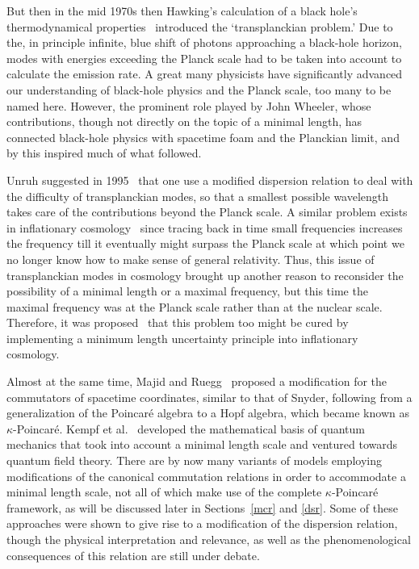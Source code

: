 \documentclass{article}
\begin{document}
But then in the mid 1970s then Hawking's  calculation of a black hole's  
thermodynamical properties~\cite{Hawking} introduced the `transplanckian problem.' Due to the, in principle infinite, blue shift of
photons approaching a black-hole horizon, modes with energies exceeding the Planck scale had to be taken into account
to calculate the emission rate. A great many physicists have significantly advanced our understanding of black-hole physics and the Planck scale, too many to be named here. However, the prominent
role played by John Wheeler, whose contributions, though not directly on the topic of a minimal length, has
connected black-hole physics with spacetime foam and the Planckian limit, and by this inspired much of
what followed.

Unruh suggested in 1995~\cite{Unruh} that one use a
modified dispersion relation to deal with the difficulty of transplanckian modes, so that a smallest possible wavelength takes care of the contributions beyond the Planck scale. A similar problem exists in inflationary
cosmology~\cite{Martin:2000xs} since tracing back in time small frequencies increases the frequency till it eventually might
surpass the Planck scale at which point we no longer know how to make sense of general relativity.  Thus, this issue of transplanckian modes in cosmology brought up another reason to reconsider the possibility
of a minimal length or a maximal frequency, but this time the maximal frequency was
at the Planck scale rather than at the nuclear scale. Therefore, it was proposed~\cite{Kempf:2000ac,Hassan:2002qk} 
that this problem too might be cured by implementing a minimum length
uncertainty principle into inflationary cosmology.  

Almost at the same time, Majid and Ruegg~\cite{Majid:1994cy} proposed a modification for
the commutators of spacetime coordinates, similar to that of Snyder, following from a generalization of the 
Poincar\'e algebra to a Hopf algebra, which became known as $\kappa$-Poincar\'e. Kempf et al.~\cite{Kempf:1993bq,Kempf:1994qp,Kempf:1994su,Kempf:1996ss}
developed the mathematical basis of quantum mechanics that took into account a minimal length scale
and ventured towards quantum field theory. There are by now many variants of models employing modifications
of the canonical commutation relations in order to accommodate a minimal length scale, 
not all of which make use of the complete $\kappa$-Poincar\'e framework, as will be
discussed later in Sections~\ref{mcr} and \ref{dsr}. Some of these approaches were shown to give rise to a 
modification of the dispersion relation, though the physical interpretation and relevance, as well
as the phenomenological consequences of this relation are still under debate. 
\end{document}
